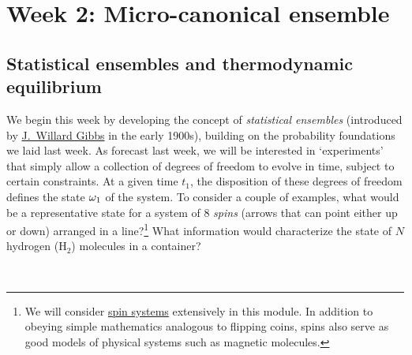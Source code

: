 \renewcommand{\thisweek}{MATH327 Week 2}
\renewcommand{\moddate}{Last modified 5 Feb.~2021}
\setcounter{section}{2}
\setcounter{subsection}{0}
{}
\section*{Week 2: Micro-canonical ensemble}

\subsection{Statistical ensembles and thermodynamic equilibrium}
We begin this week by developing the concept of \textit{statistical ensembles} (introduced by \href{https://en.wikipedia.org/wiki/Josiah_Willard_Gibbs}{J.\ Willard Gibbs} in the early 1900s), building on the probability foundations we laid last week.
As forecast last week, we will be interested in `experiments' that simply allow a collection of degrees of freedom to evolve in time, subject to certain constraints.
At a given time $t_1$, the disposition of these degrees of freedom defines the state $\omega_1$ of the system.
To consider a couple of examples, what would be a representative state for a system of $8$ \textit{spins} (arrows that can point either up or down) arranged in a line?\footnote{We will consider \href{https://en.wikipedia.org/wiki/Spin_model}{spin systems} extensively in this module.  In addition to obeying simple mathematics analogous to flipping coins, spins also serve as good models of physical systems such as magnetic molecules.}
What information would characterize the state of $N$ hydrogen (H$_2$) molecules in a container?
\begin{mdframed}
  \ \\[100 pt]
\end{mdframed}

